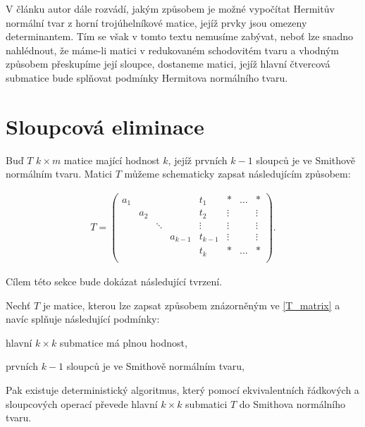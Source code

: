 V článku \cite{SNF_Arne} autor dále rozvádí, jakým způsobem je možné vypočítat
Hermitův normální tvar z horní trojúhelníkové matice, jejíž prvky jsou omezeny
determinantem. Tím se však v tomto textu nemusíme zabývat, neboť lze snadno
nahlédnout, že máme-li matici v redukovaném schodovitém tvaru a vhodným způsobem
přeskupíme její sloupce, dostaneme matici, jejíž hlavní čtvercová submatice bude
splňovat podmínky Hermitova normálního tvaru.

\section{Sloupcová eliminace}

Buď $ T $ $ k \times m $ matice mající hodnost $ k $, jejíž prvních $ k - 1 $
sloupců je ve Smithově normálním tvaru. Matici $ T $ můžeme schematicky zapsat
následujícím způsobem:

\begin{align} \label{T_matrix}
T =
    \left(
    \begin{array}{ccccc|ccc}
        a_1 &     &        &         & t_1     & \ast   & \hdots & \ast   \\
            & a_2 &        &         & t_2     & \vdots &        & \vdots \\
            &     & \ddots &         & \vdots  & \vdots &        & \vdots \\
            &     &        & a_{k-1} & t_{k-1} & \vdots &        & \vdots \\
            &     &        &         & t_k     & \ast   & \hdots & \ast   \\
    \end{array}
    \right)
.
\end{align}

Cílem této sekce bude dokázat následující tvrzení.

\begin{vet} \label{Sloup_elim}
Nechť $ T $ je matice, kterou lze zapsat způsobem znázorněným ve \eqref{T_matrix}
a navíc splňuje následující podmínky:
\begin{Cond}[series=Sloup_elim_CONDS]
    \item hlavní $ k \times k $ submatice má plnou hodnost,
    \item prvních $ k - 1 $ sloupců je ve Smithově normálním tvaru,
\end{Cond}
Pak existuje deterministický algoritmus, který pomocí ekvivalentních řádkových
a sloupcových operací převede hlavní $ k \times k $ submatici $ T $ do
Smithova normálního tvaru.
\end{vet}


